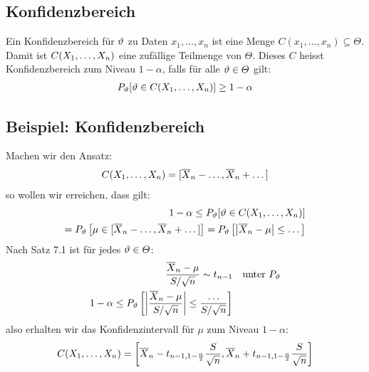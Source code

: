 \subsection{Konfidenzbereich}
Ein Konfidenzbereich für $\vartheta$ zu Daten $x_1, \dots, x_n$ ist eine Menge $C
  (x_1, \dots, x_n) \subseteq \varTheta$. Damit ist $C (X_1, \dots, X_n)$ eine
zufällige Teilmenge von $\varTheta$. Dieses $C$ heisst Konfidenzbereich zum
Niveau $1 - \alpha$, falls für alle $\vartheta \in \varTheta$ gilt:
\begin{align*}
  P_\vartheta [\vartheta \in C (X_1, \dots, X_n)] \geq 1 - \alpha
\end{align*}
\BoxStart{}
\subsection{Beispiel: Konfidenzbereich}
Machen wir den Ansatz:
\begin{align*}
  C (X_1, \dots, X_n) = [\overline{X}_n - \dots, \overline{X}_n + \dots]
\end{align*}
so wollen wir erreichen, dass gilt:
\begin{align*}
  1 - \alpha \leq P_\vartheta[\vartheta \in  C (X_1, \dots, X_n)] \\
  = P_\vartheta \left[ \mu \in [\overline{X}_n - \dots, \overline{X}_n + \dots] \right]
  = P_\vartheta \left[ \abs{\overline{X}_n - \mu} \leq \dots \right]
\end{align*}
Nach Satz 7.1 ist für jedes $\vartheta \in \varTheta$:
\begin{align*}
  \frac{\overline{X}_n - \mu}{S / \sqrt{n}} \sim t_{n-1} &  & \text{unter } P_\vartheta \\
  1 - \alpha \leq P_\vartheta \left[ \abs{\frac{\overline{X}_n - \mu}{S / \sqrt{n}}} \leq \frac{\dots}{S / \sqrt{n}} \right]
\end{align*}
also erhalten wir das Konfidenzintervall für $\mu$ zum Niveau $1 - \alpha$:
\begin{align*}
  C (X_1, \dots, X_n) = \left[ \overline{X}_n - t_{n-1, 1 - \frac{\alpha}{2}} \frac{S}{\sqrt{n}}, \overline{X}_n + t_{n-1, 1 - \frac{\alpha}{2}} \frac{S}{\sqrt{n}} \right]
\end{align*}
\BoxEnd{}
